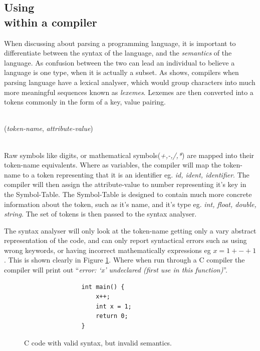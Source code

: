 \subsection{Using \hierarchy{} \\within a compiler}
When discussing about parsing a programming language, it is important to differentiate between the syntax of the language, and the \emph{semantics} of the language. As confusion between the two can lead an individual to believe a language is one type, when it is actually a subset. As \autocite{DragonBook} shows, compilers when parsing language have a lexical analyser, which would group characters into much more meaningful sequences known as \emph{lexemes}. Lexemes are then converted into a tokens commonly in the form of a key, value pairing.\\\\ \centerline{(\emph{token-name}, \emph{attribute-value})} \\

Raw symbols like digits, or mathematical symbols(\emph{+,-,/,*}) are mapped into their token-name equivalents. Where as variables, the compiler will map the token-name to a token representing that it is an identifier eg. \emph{id, ident, identifier}. The compiler will then assign the attribute-value to number representing it's key in the Symbol-Table. The Symbol-Table is designed to contain much more concrete information about the token, such as it's name, and it's type eg. \emph{int, float, double, string}. The set of tokens is then passed to the syntax analyser. 

The syntax analyser will only look at the token-name getting only a vary abstract representation of the code, and can only report syntactical errors such as using wrong keywords, or having incorrect mathematically expressions eg $x = 1 + - + 1$. This is shown clearly in Figure \ref{fig:InvalidC}. Where when run through a C compiler the compiler will print out ``\emph{error: \lq{}x\rq{} undeclared (first use in this function)}''. 

\begin{figure}[ht!]
    \begin{verbatim}
                int main() {
                    x++;
                    int x = 1;
                    return 0;
                }
    \end{verbatim}
    \caption{C code with valid syntax, but invalid semantics.}
    \label{fig:InvalidC}
\end{figure}


